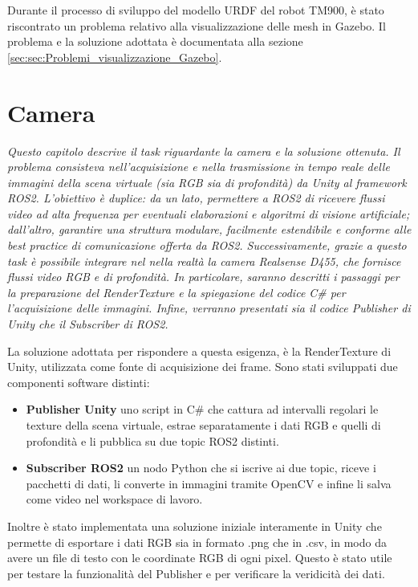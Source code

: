\documentclass[11pt]{report}
\begin{document}
Durante il processo di sviluppo del modello URDF del robot TM900, è stato riscontrato un problema relativo alla visualizzazione delle mesh in Gazebo. Il problema e la soluzione adottata è documentata alla sezione \ref{sec:sec:Problemi_visualizzazione_Gazebo}.

\section{Camera}
\label{sec:camera}
\textit{Questo capitolo descrive il task riguardante la camera e la soluzione ottenuta. Il problema consisteva nell’acquisizione e nella trasmissione in tempo reale delle immagini della scena virtuale (sia RGB sia di profondità) da Unity al framework ROS2. L’obiettivo è duplice: da un lato, permettere a ROS2 di ricevere flussi video ad alta frequenza per eventuali elaborazioni e algoritmi di visione artificiale; dall’altro, garantire una struttura modulare, facilmente estendibile e conforme alle best practice di comunicazione offerta da ROS2. Successivamente, grazie a questo task è possibile integrare nel nella realtà la camera Realsense D455, che fornisce flussi video RGB e di profondità. In particolare, saranno descritti i passaggi per la preparazione del RenderTexture e la spiegazione del codice C\# per l’acquisizione delle immagini. Infine, verranno presentati sia il codice Publisher di Unity che il Subscriber di ROS2.}

La soluzione adottata per rispondere a questa esigenza, è la RenderTexture di Unity, utilizzata come fonte di acquisizione dei frame. Sono stati sviluppati due componenti software distinti:
\begin{itemize}
    \item \textbf{Publisher Unity} uno script in C\# che cattura ad intervalli regolari le texture della scena virtuale, estrae separatamente i dati RGB e quelli di profondità e li pubblica su due topic ROS2 distinti.

    \item \textbf{Subscriber ROS2} un nodo Python che si iscrive ai due topic, riceve i pacchetti di dati, li converte in immagini tramite OpenCV e infine li salva come video nel workspace di lavoro.
\end{itemize}

Inoltre è stato implementata una soluzione iniziale interamente in Unity che permette di esportare i dati RGB sia in formato .png che in .csv, in modo da avere un file di testo con le coordinate RGB di ogni pixel. Questo è stato utile per testare la funzionalità del Publisher e per verificare la veridicità dei dati.
\end{document}
